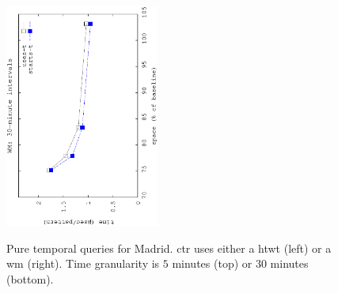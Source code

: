 \begin{figure}[!ht]
\begin{center}
\begin{center}
				{\includegraphics[angle=-90,width=0.45\textwidth]{figures_synt/madrid_t30mwm.eps}}
			\end{center}
		\end{center}
		\vspace{-0.5cm}
		\caption{Pure temporal queries for Madrid. \acrlong{ctr} uses either a \acrlong{htwt} (left) or a \acrlong{wm} (right). 
			Time granularity is $5$ minutes (top) or $30$ minutes (bottom).}
		\label{fig:madridst_topk}
		\vspace{-0.3cm}





\end{figure}
